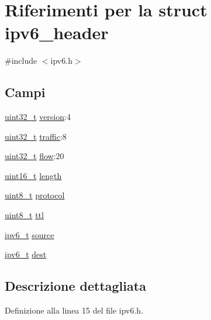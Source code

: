\hypertarget{structipv6__header}{\section{Riferimenti per la struct ipv6\+\_\+header}
\label{structipv6__header}
}


{\ttfamily \#include $<$ipv6.\+h$>$}

\subsection*{Campi}
\begin{DoxyCompactItemize}
\item 
\hyperlink{aplus_8h_a53a0df51603c77c2aa5b9ea61b606a82}{uint32\+\_\+t} \hyperlink{structipv6__header_acf470d4fdf8b7215b3a2b02b0bf030b6}{version}\+:4
\item 
\hyperlink{aplus_8h_a53a0df51603c77c2aa5b9ea61b606a82}{uint32\+\_\+t} \hyperlink{structipv6__header_a606cd7e1d19fc609e648d88aabcd7b55}{traffic}\+:8
\item 
\hyperlink{aplus_8h_a53a0df51603c77c2aa5b9ea61b606a82}{uint32\+\_\+t} \hyperlink{structipv6__header_aa6ff2108b230be0d4bbafbc25ae7bc23}{flow}\+:20
\item 
\hyperlink{aplus_8h_a5a8b2dc9e45a9ee81a94ef304fb62505}{uint16\+\_\+t} \hyperlink{structipv6__header_a20e60988c954fcd0ee95248930ed616a}{length}
\item 
\hyperlink{aplus_8h_ae0430369c5a35dcdbc0bc19dcbb33a03}{uint8\+\_\+t} \hyperlink{structipv6__header_af41f2a0627f0f1dbd7e5fa905a090984}{protocol}
\item 
\hyperlink{aplus_8h_ae0430369c5a35dcdbc0bc19dcbb33a03}{uint8\+\_\+t} \hyperlink{structipv6__header_a33bb04e114be3a3e1d5dd2c360bc4844}{ttl}
\item 
\hyperlink{netif_8h_a0a195da7affbedb767969c3a02c9a82d}{ipv6\+\_\+t} \hyperlink{structipv6__header_a1ad13965e74030de39800b8208b81d50}{source}
\item 
\hyperlink{netif_8h_a0a195da7affbedb767969c3a02c9a82d}{ipv6\+\_\+t} \hyperlink{structipv6__header_ae2c5d1ad1745ee57c4be6f9e5ed46511}{dest}
\end{DoxyCompactItemize}


\subsection{Descrizione dettagliata}


Definizione alla linea 15 del file ipv6.\+h.




